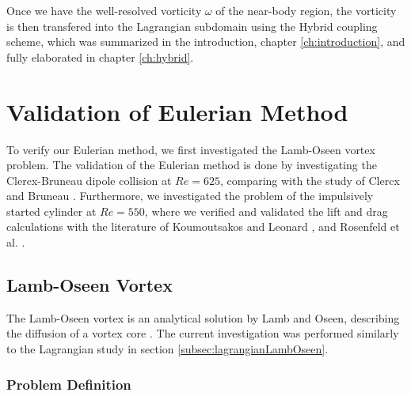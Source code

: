 Once we have the well-resolved vorticity $\omega$ of the near-body region, the vorticity is then transfered into the Lagrangian subdomain using the Hybrid coupling scheme, which was summarized in the introduction, chapter \ref{ch:introduction}, and fully elaborated in chapter \ref{ch:hybrid}.

\section{Validation of Eulerian Method}
\label{sec:eu-voem}

To verify our Eulerian method, we first investigated the Lamb-Oseen vortex problem. The validation of the Eulerian method is done by investigating the Clercx-Bruneau dipole collision at $Re=625$, comparing with the study of Clercx and Bruneau \cite{Clercx2006a}. Furthermore, we investigated the problem of the impulsively started cylinder at $Re=550$, where we verified and validated the lift and drag calculations with the literature of Koumoutsakos and Leonard \cite{Koumoutsakos1995a}, and Rosenfeld et al. \cite{MosheRosenFeldDochanKwak1991}.

\subsection{Lamb-Oseen Vortex}
\label{subsec:eulerianLambOseen}

The Lamb-Oseen vortex is an analytical solution by Lamb and Oseen, describing the diffusion of a vortex core \cite{Tryggeson2007}. The current investigation was performed similarly to the Lagrangian study in section \ref{subsec:lagrangianLambOseen}. 

\subsubsection*{Problem Definition}

